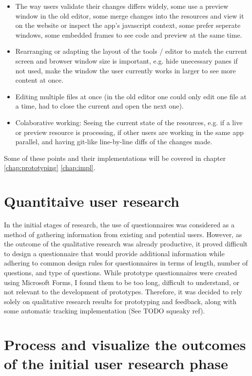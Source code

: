 \begin{itemize}
  \item The way users validate their changes differs widely, some use a preview window in the old editor, some merge changes into the resources and view it on the website or inspect the app's javascript context, some prefer seperate windows, some embedded frames to see code and preview at the same time.
  \item Rearranging or adapting the layout of the tools / editor to match the current screen and browser window size is important, e.g. hide unecessary panes if not used, make the window the user currently works in larger to see more content at once.
  \item Editing multiple files at once (in the old editor one could only edit one file at a time, had to close the current and open the next one).
  \item Colaborative working: Seeing the current state of the resources, e.g. if a live or preview resource is processing, if other users are working in the same app parallel, and having git-like line-by-line diffs of the changes made.
\end{itemize}

Some of these points and their implementations will be covered in chapter \ref*{chap:prototyping} \ref*{chap:impl}.

\section{Quantitaive user research}

In the initial stages of research, the use of questionnaires was considered as a method of gathering information from existing and potential users.
However, as the outcome of the qualitative research was already productive, it proved difficult to design a questionnaire that would provide additional information while adhering to common design rules for questionnaires in terms of length, number of questions, and type of questions.
While prototype questionnaires were created using Microsoft Forms, I found them to be too long, difficult to understand, or not relevant to the development of prototypes.
Therefore, it was decided to rely solely on qualitative research results for prototyping and feedback, along with some automatic tracking implementation (See TODO squeaky ref).
\\
\section{Process and visualize the outcomes of the initial user research phase}

